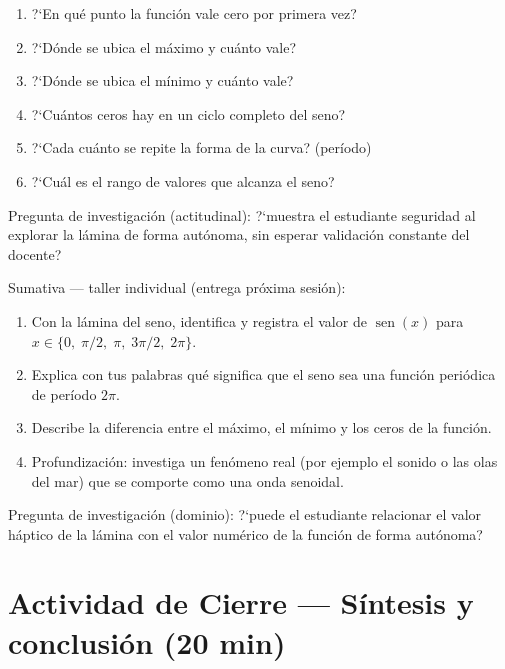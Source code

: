 \documentclass[14pt, a4paper]{extarticle}
\begin{document}
\begin{enumerate}[itemsep=4pt]
  \item ?`En qu\'e punto la funci\'on vale cero por primera vez?
  \item ?`D\'onde se ubica el m\'aximo y cu\'anto vale?
  \item ?`D\'onde se ubica el m\'inimo y cu\'anto vale?
  \item ?`Cu\'antos ceros hay en un ciclo completo del seno?
  \item ?`Cada cu\'anto se repite la forma de la curva? (per\'iodo)
  \item ?`Cu\'al es el rango de valores que alcanza el seno?
\end{enumerate}

Pregunta de investigaci\'on (actitudinal): ?`muestra el estudiante seguridad al
explorar la l\'amina de forma aut\'onoma, sin esperar validaci\'on constante del
docente?

\vspace{6pt}
Sumativa --- taller individual (entrega pr\'oxima sesi\'on):

\begin{enumerate}[itemsep=4pt]
  \item Con la l\'amina del seno, identifica y registra el valor de
        $\operatorname{sen}(x)$ para
        $x\in\{0,\;\pi/2,\;\pi,\;3\pi/2,\;2\pi\}$.
  \item Explica con tus palabras qu\'e significa que el seno sea una funci\'on
        peri\'odica de per\'iodo $2\pi$.
  \item Describe la diferencia entre el m\'aximo, el m\'inimo y los ceros de la
        funci\'on.
  \item Profundizaci\'on: investiga un fen\'omeno real (por ejemplo el sonido o
        las olas del mar) que se comporte como una onda senoidal.
\end{enumerate}

Pregunta de investigaci\'on (dominio): ?`puede el estudiante relacionar el valor
h\'aptico de la l\'amina con el valor num\'erico de la funci\'on de forma
aut\'onoma?

\section{Actividad de Cierre \normalfont--- S\'intesis y conclusi\'on
\normalfont(20 min)}
\end{document}
